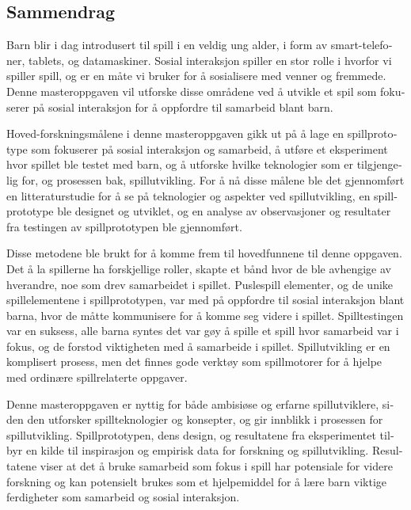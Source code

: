 \begin{otherlanguage}{norsk}
\chapter*{Sammendrag}
Barn blir i dag introdusert til spill i en veldig ung alder, i form av smart-telefoner, tablets, og datamaskiner. Sosial interaksjon spiller en stor rolle i hvorfor vi spiller spill, og er en måte vi bruker for å sosialisere med venner og fremmede. Denne masteroppgaven vil utforske disse områdene ved å utvikle et spil som fokuserer på sosial interaksjon for å oppfordre til samarbeid blant barn.

Hoved-forskningsmålene i denne masteroppgaven gikk ut på å lage en spillprototype som fokuserer på sosial interaksjon og samarbeid, å utføre et eksperiment hvor spillet ble testet med barn, og å utforske hvilke teknologier som er tilgjengelig for, og prosessen bak, spillutvikling. For å nå disse målene ble det gjennomført en litteraturstudie for å se på teknologier og aspekter ved spillutvikling, en spillprototype ble designet og utviklet, og en analyse av observasjoner og resultater fra testingen av spillprototypen ble gjennomført.

Disse metodene ble brukt for å komme frem til hovedfunnene til denne oppgaven. Det å la spillerne ha forskjellige roller, skapte et bånd hvor de ble avhengige av hverandre, noe som drev samarbeidet i spillet. Puslespill elementer, og de unike spillelementene i spillprototypen, var med på oppfordre til sosial interaksjon blant barna, hvor de måtte kommunisere for å komme seg videre i spillet. Spilltestingen var en suksess, alle barna syntes det var gøy å spille et spill hvor samarbeid var i fokus, og de forstod viktigheten med å samarbeide i spillet. Spillutvikling er en komplisert prosess, men det finnes gode verktøy som spillmotorer for å hjelpe med ordinære spillrelaterte oppgaver.

Denne masteroppgaven er nyttig for både ambisiøse og erfarne spillutviklere, siden den utforsker spillteknologier og konsepter, og gir innblikk i prosessen for spillutvikling. Spillprototypen, dens design, og resultatene fra eksperimentet tilbyr en kilde til inspirasjon og empirisk data for forskning og spillutvikling. Resultatene viser at det å bruke samarbeid som fokus i spill har potensiale for videre forskning og kan potensielt brukes som et hjelpemiddel for å lære barn viktige ferdigheter som samarbeid og sosial interaksjon.
\end{otherlanguage}